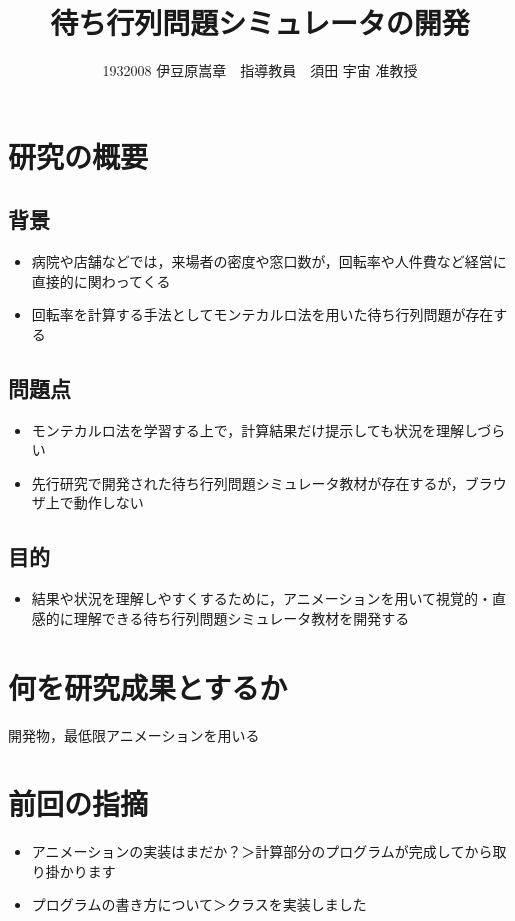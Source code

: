 \documentclass[a4j,10pt]{ltjsarticle}
\begin{document}
\title{待ち行列問題シミュレータの開発}
\author{1932008 伊豆原嵩章　指導教員　須田 宇宙 准教授}
\maketitle


\section{研究の概要}
\subsection{背景}
\begin{itemize}
\item {病院や店舗などでは，来場者の密度や窓口数が，回転率や人件費など経営に直接的に関わってくる}
\item {回転率を計算する手法としてモンテカルロ法を用いた待ち行列問題が存在する}
\end{itemize}

\subsection{問題点}
\begin{itemize}
\item{モンテカルロ法を学習する上で，計算結果だけ提示しても状況を理解しづらい}
\item{先行研究で開発された待ち行列問題シミュレータ教材が存在するが，ブラウザ上で動作しない}
\end{itemize}

\subsection{目的}
\begin{itemize}
\item{結果や状況を理解しやすくするために，アニメーションを用いて視覚的・直感的に理解できる待ち行列問題シミュレータ教材を開発する}
\end{itemize}

\section{何を研究成果とするか}開発物，最低限アニメーションを用いる

\section{前回の指摘}
\begin{itemize}
\item{アニメーションの実装はまだか？＞計算部分のプログラムが完成してから取り掛かります}
\item{プログラムの書き方について＞クラスを実装しました}
\end{itemize}
\end{document}
